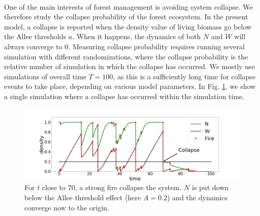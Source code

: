 \documentclass{article}
\begin{document}
\paragraph{}
One of the main interests of forest management is avoiding system collapse. We therefore study the collapse probability of the forest ecosystem. In the present model, a collapse is reported when the density value of living biomass go below the Allee thresholds $a$. When it happens, the dynamics of both $N$ and $W$ will always converge to $0$. Measuring collapse probability requires running several simulation with different randomizations, where the collapse probability is the relative number of simulation in which the collapse has occurred. We mostly use simulations of overall time $T=100$, as this is a sufficiently long time for collapse events to take place, depending on various model parameters.
In Fig. \ref{fig:collapse}. we show a single simulation where a collapse has occurred within the simulation time.

\newpage

\begin{figure}[h!] 
\centering
\includegraphics[width=12.cm]{time_series_cp_1.png}
\caption{For $t$ close to $70$, a strong fire collapse the system. $N$ is put down below the Allee threshold effect (here $A=0.2$) and the dynamics converge now to the origin.
\label{fig:collapse}
}

\end{figure}



\label{variability}
\end{document}
